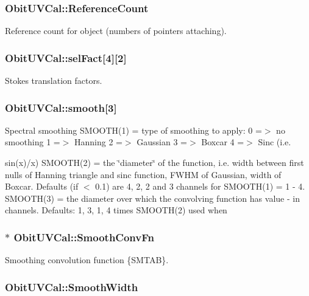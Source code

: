 \subsubsection{ {\bf Obit\-UVCal::Reference\-Count}}\label{structObitUVCal_o2}


Reference count for object (numbers of pointers attaching). 

\subsubsection{ {\bf Obit\-UVCal::sel\-Fact}[4][2]}\label{structObitUVCal_o26}


Stokes translation factors. 

\subsubsection{ {\bf Obit\-UVCal::smooth}[3]}\label{structObitUVCal_o27}


Spectral smoothing SMOOTH(1) = type of smoothing to apply: 0 =$>$ no smoothing 1 =$>$ Hanning 2 =$>$ Gaussian 3 =$>$ Boxcar 4 =$>$ Sinc (i.e. 

sin(x)/x) SMOOTH(2) = the \char`\"{}diameter\char`\"{} of the function, i.e. width between first nulls of Hanning triangle and sinc function, FWHM of Gaussian, width of Boxcar. Defaults (if $<$ 0.1) are 4, 2, 2 and 3 channels for SMOOTH(1) = 1 - 4. SMOOTH(3) = the diameter over which the convolving function has value - in channels. Defaults: 1, 3, 1, 4 times SMOOTH(2) used when 
\subsubsection{$\ast$ {\bf Obit\-UVCal::Smooth\-Conv\-Fn}}\label{structObitUVCal_o32}


Smoothing convolution function \{SMTAB\}. 

\subsubsection{ {\bf Obit\-UVCal::Smooth\-Width}}\label{structObitUVCal_o31}


